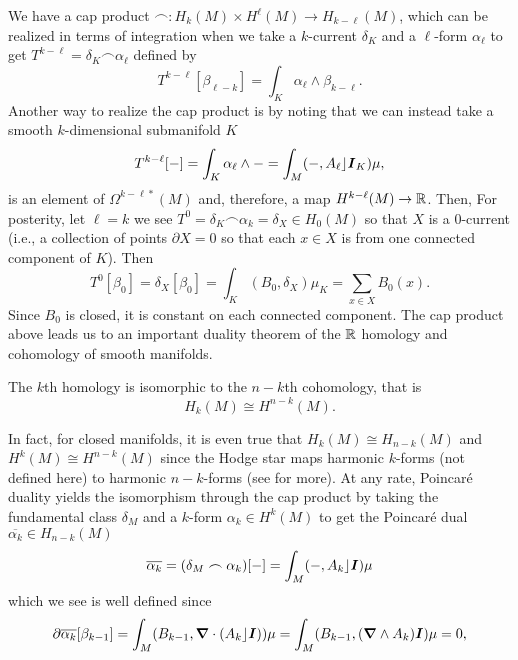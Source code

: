 \documentclass[conf]{new-aiaa}
\begin{document}
We have a cap product $\frown \colon H_k(M)\times H^\ell(M) \to H_{k-\ell}(M)$, which can be realized in terms of integration when we take a $k$-current $\delta_K$ and a $\ell$-form $\alpha_\ell$ to get $T^{k-\ell} = \delta_K \frown  \alpha_\ell$ defined by
\begin{equation}
T^{k-\ell}[\beta_{\ell - k}] = \int_{K} \alpha_\ell \wedge \beta_{k-\ell}.
\end{equation}
Another way to realize the cap product is by noting that we can instead take a smooth $k$-dimensional submanifold $K$
\begin{equation}
T^{k-\ell}[-] = \int_K \alpha_\ell \wedge - = \int_M (-,A_\ell \rfloor \boldsymbol{I}_K) \mu,
\end{equation}
is an element of $\Omega^{k-\ell*}(M)$ and, therefore, a map $H^{k-\ell}(M)\to \mathbb{R}$. Then, For posterity, let $\ell = k$ we see $T^0 = \delta_K \frown \alpha_k = \delta_{X} \in H_0(M)$ so that $X$ is a $0$-current (i.e., a collection of points $\partial X = 0$ so that each $x\in X$ is from one connected component of $K$). Then
\begin{equation}
T^0[\beta_0] = \delta_{X}[\beta_0] = \int_{K} (B_0 , \delta_X ) \mu_{K} = \sum_{x\in X} B_0(x).
\end{equation}
Since $B_0$ is closed, it is constant on each connected component. The cap product above leads us to an important duality theorem of the $\mathbb{R}$ homology and cohomology of smooth manifolds.
\begin{theorem}
    The $k$th homology is isomorphic to the $n-k$th cohomology, that is 
\begin{equation}
H_k(M) \cong H^{n-k}(M).
\end{equation}
\end{theorem}
In fact, for closed manifolds, it is even true that $H_k(M)\cong H_{n-k}(M)$ and $H^k(M)\cong H^{n-k}(M)$ since the Hodge star maps harmonic $k$-forms (not defined here) to harmonic $n-k$-forms (see \cite{cappell_cohomology_2006} for more). At any rate, Poincar\'e duality yields the isomorphism through the cap product by taking the fundamental class $\delta_M$ and a $k$-form $\alpha_k \in H^k(M)$ to get the Poincar\'e dual $\overline{\alpha_k} \in H_{n-k}(M)$
\begin{equation}
\overline{\alpha_k} = (\delta_M \frown \alpha_k)[-] = \int_M (-,A_k \rfloor \boldsymbol{I})\mu
\end{equation}
which we see is well defined since
\begin{align}
\partial \overline{\alpha_k}[\beta_{k-1}] = \int_M (B_{k-1}, \boldsymbol{\nabla} \cdot (A_k \rfloor \boldsymbol{I}))\mu = \int_M (B_{k-1},(\boldsymbol{\nabla} \wedge A_k)\boldsymbol{I}) \mu =0,
\end{align}
\end{document}
